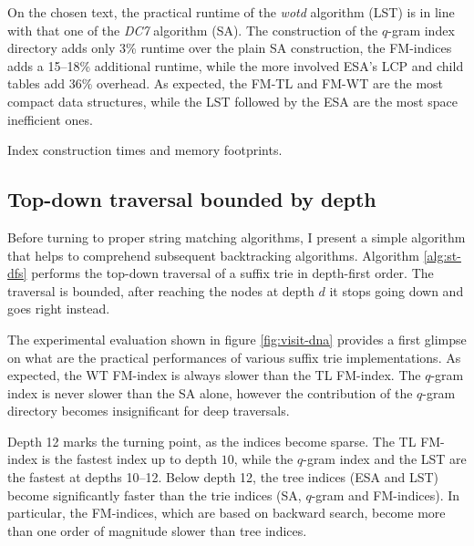 On the chosen text, the practical runtime of the \emph{wotd} algorithm (LST) is in line with that one of the \emph{DC7} algorithm (SA). The construction of the $q$-gram index directory adds only 3\% runtime over the plain SA construction, the FM-indices adds a 15--18\% additional runtime, while the more involved ESA's LCP and child tables add 36\% overhead.
As expected, the FM-TL and FM-WT are the most compact data structures, while the LST followed by the ESA are the most space inefficient ones.

\begin{table}[t]
\begin{center}
\caption[Index construction times and memory footprints]{Index construction times and memory footprints.}
\sffamily

\label{tab:index:construction}
\end{center}
\end{table}

\subsection{Top-down traversal bounded by depth}
\label{sec:index:algo:traversal}

Before turning to proper string matching algorithms, I present a simple algorithm that helps to comprehend subsequent backtracking algorithms.
Algorithm \ref{alg:st-dfs} performs the top-down traversal of a suffix trie in depth-first order.
The traversal is bounded, \ie after reaching the nodes at depth $d$ it stops going down and goes right instead.

The experimental evaluation shown in figure \ref{fig:visit-dna} provides a first glimpse on what are the practical performances of various suffix trie implementations.
As expected, the WT FM-index is always slower than the TL FM-index.
The $q$-gram index is never slower than the SA alone, however the contribution of the $q$-gram directory becomes insignificant for deep traversals.

Depth 12 marks the turning point, as the indices become sparse.
The TL FM-index is the fastest index up to depth $10$, while the $q$-gram index and the LST are the fastest at depths 10--12.
Below depth 12, the tree indices (ESA and LST) become significantly faster than the trie indices (SA, $q$-gram and FM-indices).
In particular, the FM-indices, which are based on backward search, become more than one order of magnitude slower than tree indices.

